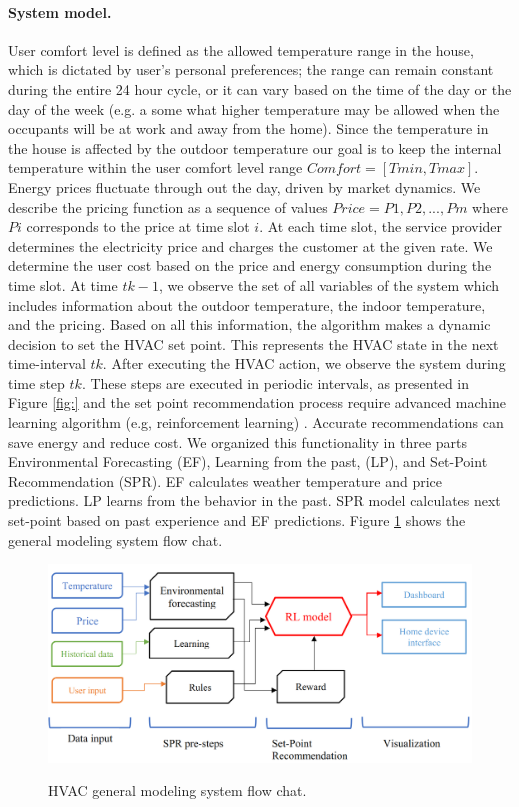 \paragraph*{System model.}
User comfort level is defined as the allowed temperature range in the house, which is dictated by user’s personal preferences; the range can remain constant during the entire 24 hour cycle, or it can vary based on the time of the day or the day of the week (e.g. a some what higher temperature may be allowed when the occupants will be at work and away from the home). Since the temperature in the house is affected by the outdoor temperature our goal is to keep the internal temperature within the user comfort level range $Comfort = [Tmin, Tmax]$. 
Energy prices fluctuate through out the day, driven by market dynamics. We describe the pricing function as a sequence of values $Price = {P1, P2, . . . , Pm}$ where $Pi$ corresponds to the price at time slot $i$. At each time slot, the service provider determines the electricity price and charges the customer at the given rate. We determine the user cost based on the price and energy consumption during the time slot. At time $tk-1$, we observe the set of all variables of the system which includes information about the outdoor temperature, the indoor temperature, and the pricing. Based on all this information, the  algorithm makes a dynamic decision to set the HVAC set point. This represents the HVAC state in the next time-interval $tk$. After executing the HVAC action, we observe the system during time step $tk$. These steps are executed in periodic intervals, as presented in Figure \ref{fig:} and the set point recommendation process require advanced machine learning algorithm (e.g, reinforcement learning) \cite{kotevska2020rl}. Accurate recommendations can save energy and reduce cost. We organized this functionality in three parts Environmental Forecasting (EF), Learning from the past, (LP), and Set-Point Recommendation (SPR). EF calculates weather temperature and price predictions. LP learns from the behavior in the past. SPR model calculates next set-point based on past experience and EF predictions. Figure \ref{fig:hvac1_flowchart} shows the general modeling system flow chat.

\begin{figure}[htb]
\centering\includegraphics[width=1.0\columnwidth]{usecase/hvac.png}
\label{fig:hvac1_flowchart}
\caption{HVAC general modeling system flow chat.}
\end{figure}


